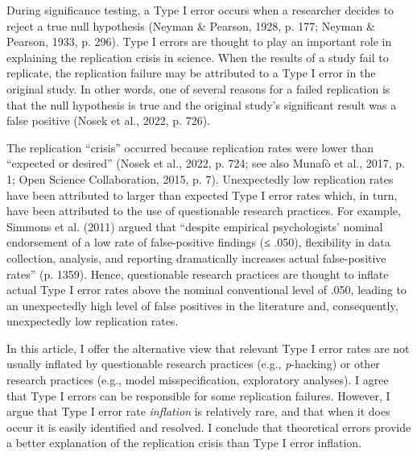 \documentclass[authordate, meta]{jote-new-article}
\author[1]{\mbox{Mark Rubin\orcid{0000-0002-6483-8561}}}
\affil[1]{Durham University}
\begin{document}
\begin{frontmatter}
  \maketitle
  \begin{abstract}
    \printabstracttext
  \end{abstract}
\end{frontmatter}










	During significance testing, a Type I error occurs when a researcher decides to reject a true null hypothesis (Neyman \& Pearson, 1928, p. 177; Neyman \& Pearson, 1933, p. 296). Type I errors are thought to play an important role in explaining the replication crisis in science. When the results of a study fail to replicate, the replication failure may be attributed to a Type I error in the original study. In other words, one of several reasons for a failed replication is that the null hypothesis is true and the original study's significant result was a false positive (Nosek et al., 2022, p. 726).



	The replication “crisis” occurred because replication rates were lower than “expected or desired” (Nosek et al., 2022, p. 724; see also Munafò et al., 2017, p. 1; Open Science Collaboration, 2015, p. 7). Unexpectedly low replication rates have been attributed to larger than expected Type I error rates which, in turn, have been attributed to the use of questionable research practices. For example, Simmons et al. (2011) argued that “despite empirical psychologists' nominal endorsement of a low rate of false-positive findings (≤ .050), flexibility in data collection, analysis, and reporting dramatically increases actual false-positive rates” (p. 1359). Hence, questionable research practices are thought to inflate actual Type I error rates above the nominal conventional level of .050, leading to an unexpectedly high level of false positives in the literature and, consequently, unexpectedly low replication rates.



	In this article, I offer the alternative view that relevant Type I error rates are not usually inflated by questionable research practices (e.g., \emph{p}-hacking) or other research practices (e.g., model misspecification, exploratory analyses). I agree that Type I errors can be responsible for some replication failures. However, I argue that Type I error rate \emph{inflation} is relatively rare, and that when it does occur it is easily identified and resolved. I conclude that theoretical errors provide a better explanation of the replication crisis than Type I error inflation.
\end{document}
